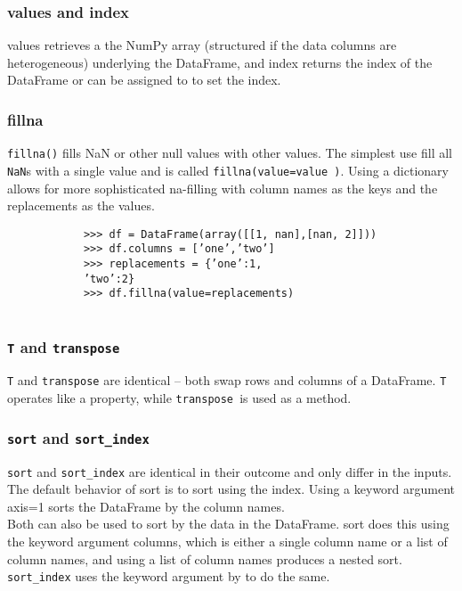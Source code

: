 \documentclass[KSmain.tex]{subfiles}
\begin{document}
\subsubsection*{values and index}
	values retrieves a the NumPy array (structured if the data columns are heterogeneous) underlying the
	DataFrame, and index returns the index of the DataFrame or can be assigned to to set the index.
	\subsubsection*{fillna}
		\texttt{fillna()} fills NaN or other null values with other values. The simplest use fill all \texttt{NaN}s with a single value
		and is called \texttt{fillna(value=value )}. Using a dictionary allows for more sophisticated na-filling with column
		names as the keys and the replacements as the values.
		\begin{framed}
			\begin{verbatim}
			>>> df = DataFrame(array([[1, nan],[nan, 2]]))
			>>> df.columns = [’one’,’two’]
			>>> replacements = {’one’:1,
			’two’:2}
			>>> df.fillna(value=replacements)
		
			\end{verbatim}
		\end{framed}
	
		\subsubsection*{\texttt{T} and \texttt{transpose}}
			\texttt{T} and \texttt{transpose} are identical – both swap rows and columns of a DataFrame. \texttt{T} operates like a property,
			while \texttt{transpose }is used as a method.
			\subsubsection*{\texttt{sort} and \texttt{sort\_index}}
			\texttt{sort} and \texttt{sort\_index} are identical in their outcome and only differ in the inputs. The default behavior
			of sort is to sort using the index. Using a keyword argument axis=1 sorts the DataFrame by the column
			names.\\ 
			
			\noindent Both can also be used to sort by the data in the DataFrame. sort does this using the keyword
			argument columns, which is either a single column name or a list of column names, and using a list of
			column names produces a nested sort. \texttt{sort\_index} uses the keyword argument by to do the same. \\
			
\end{document}

